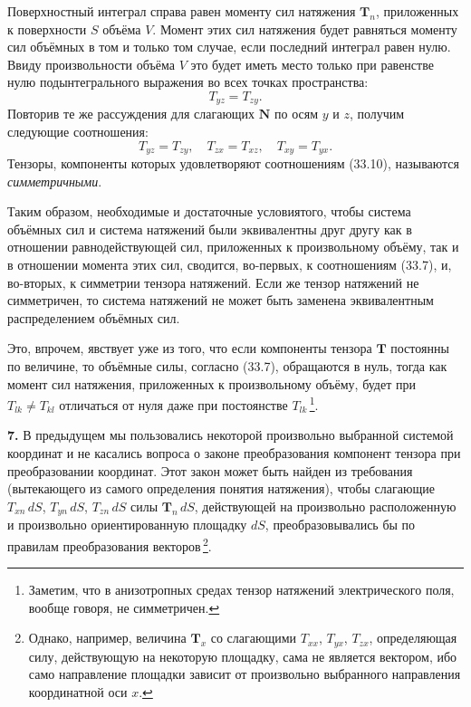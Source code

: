 \documentclass[a4paper,10pt]{article}
\begin{document}
Поверхностный интеграл справа равен моменту сил натяжения $\mathbf{T}_n$,
приложенных к поверхности $S$ объёма $V$. Момент этих сил натяжения
будет равняться моменту сил объёмных в том и только том случае, если
последний интеграл равен нулю. Ввиду произвольности объёма $V$ это
будет иметь место только при равенстве нулю подынтегрального выражения
во всех точках пространства:
$$
    T_{yz} = T_{zy}.
$$
Повторив те же рассуждения для слагающих $\mathbf{N}$ по осям $y$ и $z$,
получим следующие соотношения:
\begin{equation}
    T_{yz} = T_{zy},\quad T_{zx} = T_{xz},\quad T_{xy} = T_{yx}.
    \tag{33.10}
\end{equation}
Тензоры, компоненты которых удовлетворяют соотношениям (33.10),
называются \textit{симметричными}.

Таким образом, необходимые и достаточные условиятого, чтобы
система объёмных сил и система натяжений были эквивалентны друг
другу как в отношении равнодействующей сил, приложенных к
произвольному объёму, так и в отношении момента этих сил, сводится,
во-первых, к соотношениям (33.7), и, во-вторых, к симметрии тензора
натяжений. Если же тензор натяжений не симметричен, то система
натяжений не может быть заменена эквивалентным распределением
объёмных сил.

Это, впрочем, явствует уже из того, что если компоненты тензора
$\mathbf{T}$ постоянны по величине, то объёмные силы, согласно (33.7),
обращаются в нуль, тогда как момент сил натяжения, приложенных
к произвольному объёму, будет при $T_{lk} \neq T_{kl}$ отличаться
от нуля даже при постоянстве $T_{lk}$\,\footnote{Заметим, что
в анизотропных средах тензор натяжений электрического поля, вообще
говоря, не симметричен.}.

\textbf{7.} В предыдущем мы пользовались некоторой произвольно
выбранной системой координат и не касались вопроса о законе
преобразования компонент тензора при преобразовании координат. Этот
закон может быть найден из требования (вытекающего из самого определения
понятия натяжения), чтобы слагающие $T_{xn}\,dS$, $T_{yn}\,dS$,
$T_{zn}\,dS$ силы $\mathbf{T}_n\,dS$, действующей на произвольно
расположенную и произвольно ориентированную площадку $dS$,
преобразовывались бы по правилам преобразования
векторов\,\footnote{Однако, например, величина $\mathbf{T}_x$ со
слагающими $T_{xx}$, $T_{yx}$, $T_{zx}$, определяющая силу,
действующую на некоторую площадку, сама не является вектором, ибо
само направление площадки зависит от произвольно выбранного
направления координатной оси $x$.}.
\end{document}
